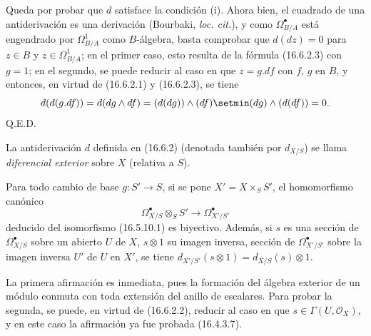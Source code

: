 Queda por probar que $d$ satisface la condición (i). Ahora bien, el cuadrado de una
antiderivación es una derivación (Bourbaki, \emph{loc. cit.}), y como
$\Omega_{B/A}^{\bullet}$ está engendrado por $\Omega_{B/A}^1$ como
$B$-álgebra, basta comprobar que $d(dz)=0$ para $z\in B$ y
$z\in\Omega_{B/A}^1$; en el primer caso, esto resulta de la fórmula
(16.6.2.3) con $g=1$; en el segundo, se puede reducir al caso en que $z=g.df$
con $f$, $g$ en $B$, y entonces, en virtud de (16.6.2.1) y (16.6.2.3), se tiene
\[
  d(d(g.df))=d(dg\wedge df)
  =(d(dg))\wedge(df)\setmin(dg)\wedge(d(df))=0.
\]
\hfill Q.E.D.

\begin{definition}[16.6.3]
\label{IV.16.6.3}
La antiderivación $d$ definida en \textup{(16.6.2)} (denotada también por $d_{X/S}$) se
llama \emph{diferencial exterior} sobre $X$ (relativa a $S$).
\end{definition}

\begin{proposition}[16.6.4]
\label{IV.16.6.4}
Para todo cambio de base $g:S'\to S$, si se pone
$X'=X\times_S S'$, el homomorfismo canónico
\[
  \varOmega_{X/S}^{\bullet}\otimes_S S'
  \longrightarrow\varOmega_{X'/S'}^{\bullet}
  \tag{16.6.4.1}
  \label{IV.16.6.4.1}
\]
deducido del isomorfismo \textup{(16.5.10.1)} es biyectivo. Además, si $s$ es una
sección de $\varOmega_{X/S}^{\bullet}$ sobre un abierto $U$ de $X$,
$s\otimes1$ su imagen inversa, sección de $\varOmega_{X'/S'}^{\bullet}$
sobre la imagen inversa $U'$ de $U$ en $X'$, se tiene
$d_{X'/S'}(s\otimes1)=d_{X/S}(s)\otimes1$.
\end{proposition}

La primera afirmación es inmediata, pues la formación del álgebra exterior
de un módulo conmuta con toda extensión del anillo de escalares. Para
probar la segunda, se puede, en virtud de (16.6.2.2), reducir al caso en que
$s\in\Gamma(U,\mathcal{O}_X)$, y en este caso la afirmación ya fue probada
(16.4.3.7).

